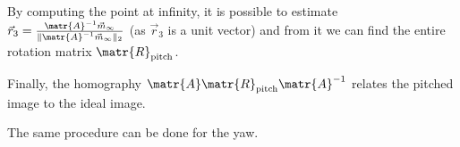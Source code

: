 \begin{descriptionlist}
\begin{example}
            By computing the point at infinity, it is possible to estimate $\vec{r}_3 = \frac{\matr{A}^{-1} \vec{m}_\infty}{\Vert \matr{A}^{-1} \vec{m}_\infty \Vert_2}$
            (as $\vec{r}_3$ is a unit vector) and from it we can find the entire rotation matrix $\matr{R}_\text{pitch}$.

            Finally, the homography $\matr{A}\matr{R}_\text{pitch}\matr{A}^{-1}$ relates the pitched image to the ideal image.

            \begin{remark}
                The same procedure can be done for the yaw.
            \end{remark}
        \end{example}
\end{descriptionlist}